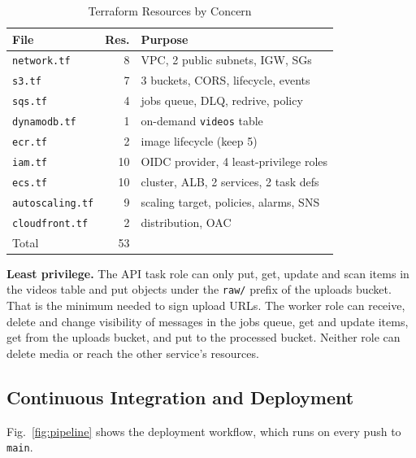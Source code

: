 \documentclass[conference]{IEEEtran}
\begin{document}
\begin{table}[t]
\caption{Terraform Resources by Concern}
\label{tab:iac}
\centering
\begin{tabular}{@{}lrl@{}}
\toprule
File & Res. & Purpose \\
\midrule
\texttt{network.tf} & 8 & VPC, 2 public subnets, IGW, SGs \\
\texttt{s3.tf} & 7 & 3 buckets, CORS, lifecycle, events \\
\texttt{sqs.tf} & 4 & jobs queue, DLQ, redrive, policy \\
\texttt{dynamodb.tf} & 1 & on-demand \texttt{videos} table \\
\texttt{ecr.tf} & 2 & image lifecycle (keep 5) \\
\texttt{iam.tf} & 10 & OIDC provider, 4 least-privilege roles \\
\texttt{ecs.tf} & 10 & cluster, ALB, 2 services, 2 task defs \\
\texttt{autoscaling.tf} & 9 & scaling target, policies, alarms, SNS \\
\texttt{cloudfront.tf} & 2 & distribution, OAC \\
\midrule
Total & 53 & \\
\bottomrule
\end{tabular}
\end{table}

\textbf{Least privilege.} The API task role can only put, get, update and scan items in the videos table and put objects under the \texttt{raw/} prefix of the uploads bucket. That is the minimum needed to sign upload URLs. The worker role can receive, delete and change visibility of messages in the jobs queue, get and update items, get from the uploads bucket, and put to the processed bucket. Neither role can delete media or reach the other service's resources.

\subsection{Continuous Integration and Deployment}
Fig.~\ref{fig:pipeline} shows the deployment workflow, which runs on every push to \texttt{main}.
\end{document}
